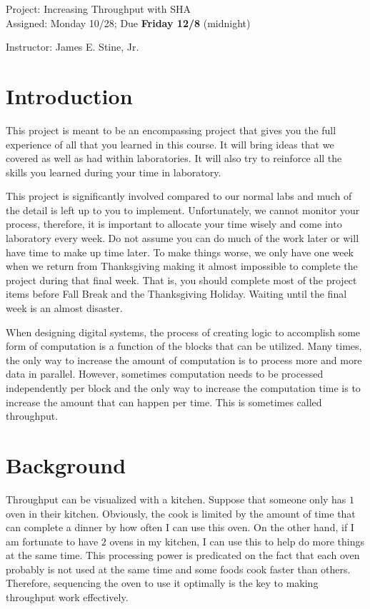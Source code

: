 \documentclass{article}
\newcommand{\myassignment}{Project: Increasing Throughput with SHA}
\newcommand{\myduedate}{Assigned: Monday 10/28; Due \textbf{Friday 12/8} (midnight)}
\newcommand{\myinstructor}{Instructor: James E. Stine, Jr.}
\begin{document}
\begin{center}
  {\huge \myassignment} \\
  {\large \myduedate} \\
  \begin{flushright}
  \myinstructor \\
  \end{flushright}
\end{center}

\section{Introduction}

This project is meant to be an encompassing project that gives you the
full experience of all that you learned in this course.  It will bring
ideas that we covered as well as had within laboratories.  It will
also try to reinforce all the skills you learned during your time in
laboratory.

This project is significantly involved compared to our normal labs
and much of the detail is left
up to you to implement.  Unfortunately, we cannot monitor your
process, therefore, it is important to allocate your
time wisely and come into laboratory every week.  Do not assume you
can do much of the work later or will have time to make up time later.
To make things worse, we only have one
week when we return from Thanksgiving making it almost impossible to
complete the project during that final week.  That is, you should
complete most of the project items before Fall Break and the
Thanksgiving Holiday.  Waiting until the final week is an almost
disaster.  

When designing digital systems, the process of creating logic to
accomplish some form of computation is a function of the blocks that
can be utilized.  Many times, the only way to increase the amount of
computation is to process more and more data in parallel.  However,
sometimes computation needs to be processed independently per block
and the only way to increase the computation time is to increase the
amount that can happen per time.  This is sometimes called
throughput.


\section{Background}

Throughput can be visualized with a kitchen.  Suppose that someone only
has $1$ oven in their kitchen.  Obviously, the cook is limited by the
amount of time that can complete a dinner by how often I can use this
oven.  On the other hand, if I am fortunate to have $2$ ovens in my
kitchen, I can use this to help do more things at the same time.  This
processing power is predicated on the fact that each oven probably is
not used at the same time and some foods cook faster than others.
Therefore, sequencing the oven to use it optimally is the key to
making throughput work effectively.
\end{document}
